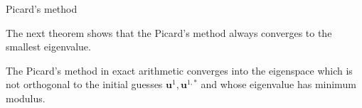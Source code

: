 \documentclass[smallextended]{svjour3}
\begin{document}
\begin{algorithm}[H] \caption{Picard's method} \label{alg:picard} 
\begin{algorithmic}


\REPEAT

\end{algorithmic}
\end{algorithm}

The next theorem shows that the Picard's method always converges to the smallest eigenvalue.\\

\begin{theorem}\label{th:picard_conv}
The Picard's method in exact arithmetic converges into the eigenspace which is not orthogonal to the initial guesses $\mathbf{u}^1,\mathbf{u}^{1,*}$ and whose eigenvalue has minimum modulus.
\end{theorem}
\end{document}
